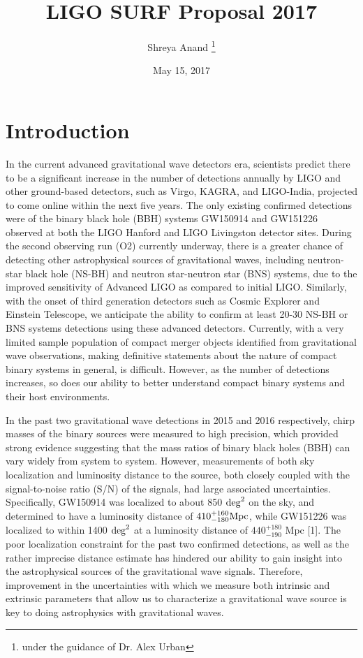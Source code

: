 \documentclass{article}
\title{LIGO SURF Proposal 2017}
\author{Shreya Anand \thanks{under the guidance of Dr. Alex Urban}}
\date{May 15, 2017}
\begin{document}
\begin{titlepage}
\maketitle
\end{titlepage}

\section{Introduction}

In the current advanced gravitational wave detectors era, scientists predict there to be a significant increase in the number of detections annually by LIGO and other ground-based detectors, such as Virgo, KAGRA, and LIGO-India, projected to come online within the next five years.  The only existing confirmed detections were of the binary black hole (BBH) systems GW150914 and GW151226 observed at both the LIGO Hanford and LIGO Livingston detector sites.  During the second observing run (O2) currently underway, there is a greater chance of detecting other astrophysical sources of gravitational waves, including neutron-star black hole (NS-BH) and neutron star-neutron star (BNS) systems, due to the improved sensitivity of Advanced LIGO as compared to initial LIGO.  Similarly, with the onset of third generation detectors such as Cosmic Explorer and Einstein Telescope, we anticipate the ability to confirm at least 20-30 NS-BH or BNS systems detections using these advanced detectors.  Currently, with a very limited sample population of compact merger objects identified from gravitational wave observations, making definitive statements about the nature of compact binary systems in general,  is difficult.  However, as the number of detections increases, so does our ability to better understand compact binary systems and their host environments.

In the past two gravitational wave detections in 2015 and 2016 respectively, chirp masses of the binary sources were measured to high precision, which provided strong evidence suggesting that the mass ratios of binary black holes (BBH) can vary widely from system to system.  However, measurements of both sky localization and luminosity distance to the source, both closely coupled with the signal-to-noise ratio (S/N) of the signals, had large associated uncertainties.  Specifically, GW150914 was localized to about 850 ${\rm deg}^{2}$ on the sky, and determined to have a luminosity distance of $410^{+160}_{-180} {\rm Mpc}$, while GW151226 was localized to within 1400 ${\rm deg}^{2}$ at a luminosity distance of $440^{+180}_{-190}$ Mpc [1].  The poor localization constraint for the past two confirmed detections, as well as the rather imprecise distance estimate has hindered our ability to gain insight into the astrophysical sources of the gravitational wave signals.  Therefore, improvement in the uncertainties with which we measure both intrinsic and extrinsic parameters that allow us to characterize a gravitational wave source is key to doing astrophysics with gravitational waves.      
 
\end{document}
